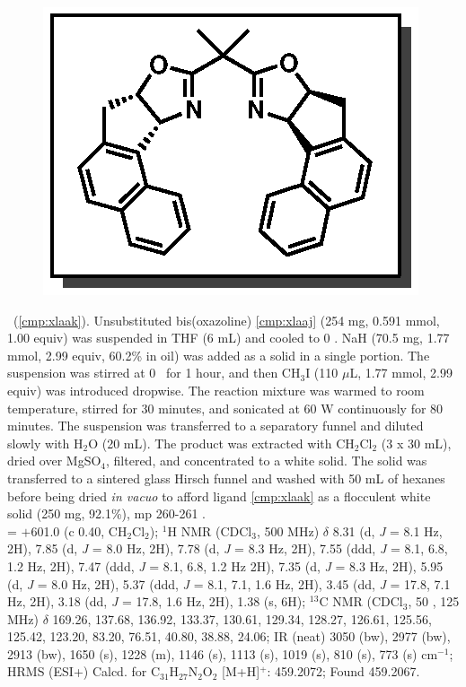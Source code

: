\vspace{10pt}
\begin{figure}
  \vspace{-22pt}
  \begin{center}
    \includegraphics[scale=0.8]{chp_asymmetric/images/xlaak}
  \end{center}
  \vspace{-30pt}
\end{figure}
\noindent \textbf{\CMPxlaak}\ (\ref{cmp:xlaak}). Unsubstituted
bis(oxazoline) \ref{cmp:xlaaj} (254 mg, 0.591 mmol, 1.00 equiv) was suspended in
THF (6 mL) and cooled to 0 \degc. NaH (70.5 mg, 1.77 mmol, 2.99 equiv, 60.2\% in oil)
was added as a solid in a single portion. The suspension was stirred at 0 \degc\ 
for 1 hour, and then CH$_3$I (110 $\mu$L, 1.77 mmol, 2.99 equiv) was
introduced dropwise. The reaction mixture was warmed to room temperature, stirred for 30
minutes, and sonicated at 60 W continuously for 80 minutes. The suspension
was transferred to a separatory funnel and diluted slowly with H$_2$O (20 mL).
The product was extracted with CH$_2$Cl$_2$ (3 x 30 mL), dried over MgSO$_4$,
filtered, and concentrated to a white solid. The solid was transferred to a sintered glass
Hirsch funnel and washed with 50 mL of hexanes before being dried \textit{in
vacuo} to afford ligand \ref{cmp:xlaak} as a flocculent white solid (250 mg,
92.1\%), mp 260-261 \degc. \\
\rotation = $+$601.0 (c 0.40, CH$_2$Cl$_2$); $^1$H NMR (CDCl$_3$, 500 MHz)
$\delta$ 8.31 (d, \textit{J} = 8.1 Hz, 2H), 7.85 (d, \textit{J} = 8.0 Hz, 2H),
7.78 (d, \textit{J} = 8.3 Hz, 2H), 7.55 (ddd, \textit{J} = 8.1, 6.8, 1.2 Hz,
2H), 7.47 (ddd, \textit{J} = 8.1, 6.8, 1.2 Hz 2H), 7.35 (d, \textit{J} = 8.3 Hz,
2H), 5.95 (d, \textit{J} = 8.0 Hz, 2H), 5.37 (ddd, \textit{J} = 8.1, 7.1, 1.6
Hz, 2H), 3.45 (dd, \textit{J} = 17.8, 7.1 Hz, 2H), 3.18 (dd, \textit{J} = 17.8,
1.6 Hz, 2H), 1.38 (s, 6H); $^{13}$C NMR (CDCl$_3$, 50 \degc, 125 MHz) $\delta$
169.26, 137.68, 136.92, 133.37, 130.61, 129.34, 128.27, 126.61, 125.56, 125.42, 123.20, 83.20,
76.51, 40.80, 38.88, 24.06; IR (neat) 3050 (bw), 2977 (bw), 2913 (bw), 1650 (s),
1228 (m), 1146 (s), 1113 (s), 1019 (s), 810 (s), 773 (s) cm$^{-1}$; HRMS (ESI+)
Calcd. for C$_{31}$H$_{27}$N$_2$O$_{2}$ [M+H]$^+$:
459.2072; Found 459.2067.

